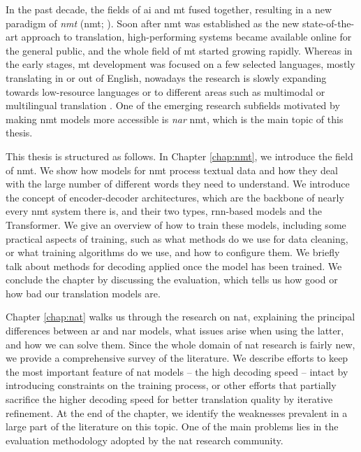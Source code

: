 In the past decade, the fields of \ac{ai} and \ac{mt} fused together, resulting
in a new paradigm of \emph{\acl{nmt}} (\acs{nmt};
\citealp{sutskever2014sequence,bahdanau2014neural}). Soon after \ac{nmt} was
established as the new state-of-the-art approach to translation,
high-performing systems became available online for the general public, and the
whole field of \ac{mt} started growing rapidly. Whereas in the early stages,
\ac{mt} development was focused on a few selected languages, mostly translating
in or out of English, nowadays the research is slowly expanding towards
low-resource languages or to different areas such as multimodal or multilingual
translation \citep{haddow2021survey, libovicky-helcl-2017-attention,
  aharoni-etal-2019-massively}. One of the emerging research subfields
motivated by making \ac{nmt} models more accessible is \emph{\acl{nar}}
\ac{nmt}, which is the main topic of this thesis.

\vspace{\baselineskip}

This thesis is structured as follows.
%
In Chapter \ref{chap:nmt}, we introduce the field of \ac{nmt}. We show how
models for \ac{nmt} process textual data and how they deal with the large
number of different words they need to understand. We introduce the concept of
encoder-decoder architectures, which are the backbone of nearly every \ac{nmt}
system there is, and their two types, \acs{rnn}-based models and the
Transformer. We give an overview of how to train these models, including some
practical aspects of training, such as what methods do we use for data
cleaning, or what training algorithms do we use, and how to configure them. We
briefly talk about methods for decoding applied once the model has been
trained. We conclude the chapter by discussing the evaluation, which tells us
how good or how bad our translation models are.

Chapter \ref{chap:nat} walks us through the research on \ac{nat}, explaining
the principal differences between \acl{ar} and \acl{nar} models, what issues
arise when using the latter, and how we can solve them.  Since the whole domain
of \ac{nat} research is fairly new, we provide a comprehensive survey of the
literature. We describe efforts to keep the most important feature of \ac{nat}
models -- the high decoding speed -- intact by introducing constraints on the
training process, or other efforts that partially sacrifice the higher decoding
speed for better translation quality by iterative refinement. At the end of the
chapter, we identify the weaknesses prevalent in a large part of the literature
on this topic. One of the main problems lies in the evaluation methodology
adopted by the \ac{nat} research community.

